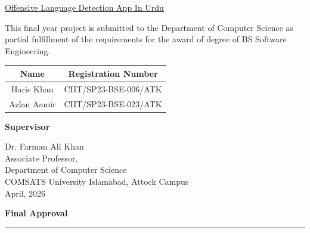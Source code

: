 \documentclass[A4paper,12pt]{report}
\theoremstyle{plain}
\theoremstyle{definition}
\theoremstyle{remark}
\numberwithin{equation}{section}
\begin{document}
\newpage
\begin{center}
\onehalfspacing\LARGE \uline{Offensive Language Detection App In Urdu}\\
\end{center}
\vspace{0.2in}

\onehalfspacing\noindent\large{This final year project is submitted to the Department of Computer Science as partial fulfillment of the requirements for the award of degree of BS Software Engineering.}
\vspace{0.4in}
\begin{table}[ht!]
\centering
{\setlength{\arrayrulewidth}{0.7mm}
\setlength{\tabcolsep}{45pt}
\renewcommand{\arraystretch}{2.5}
\begin{tabular}{|c|c|}
\hline
\rowcolor[HTML]{656565}
 \large{Name} &\large{Registration Number}  \\
 \hline
 Haris Khan & CIIT/SP23-BSE-006/ATK \\ \hline

 Azlan Aamir & CIIT/SP23-BSE-023/ATK \\ \hline
\end{tabular}
}
\end{table}
\FloatBarrier
\vspace{2in}

\noindent\large{\textbf{Supervisor}}
\begin{flushleft}
\vspace{0.3in}
\large{Dr. Farman Ali Khan\\
\vspace{0.1in}
Associate Professor,\\
Department of Computer Science\\
\vspace{0.1in}
COMSATS University Islamabad, Attock Campus\\
\vspace{0.2in}
April, 2026 }
\end{flushleft}

\newpage
\begin{center}
\Large{\textbf{{Final Approval}}}
\par\noindent\rule{\textwidth}{0.6pt}
\end{center}
\end{document}
